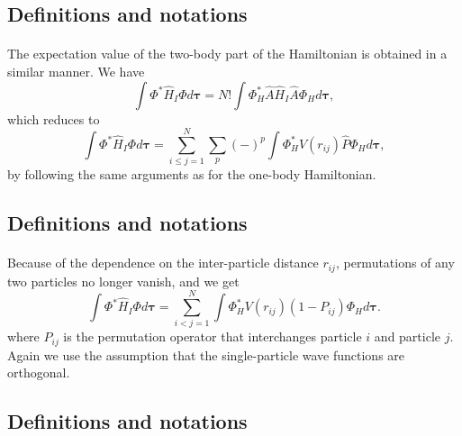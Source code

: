 \documentclass[%
twoside,                 %
final,                   %
10pt]{article}
\begin{document}
\subsection{Definitions and notations}

\paragraph{}
The expectation value of the two-body part of the Hamiltonian is obtained in a
similar manner. We have
\[
  \int \Phi^*\hat{H}_I\Phi d\mathbf{\tau} 
  = N! \int \Phi_H^*\hat{A}\hat{H}_I\hat{A}\Phi_H d\mathbf{\tau},
\]
which reduces to
\[
 \int \Phi^*\hat{H}_I\Phi d\mathbf{\tau} 
  = \sum_{i\le j=1}^N \sum_{p} (-)^p\int 
  \Phi_H^*V(r_{ij})\hat{P}\Phi_H d\mathbf{\tau},
\]
by following the same arguments as for the one-body
Hamiltonian.



\subsection{Definitions and notations}

\paragraph{}
Because of the dependence on the inter-particle distance $r_{ij}$,  permutations of
any two particles no longer vanish, and we get
\[
  \int \Phi^*\hat{H}_I\Phi d\mathbf{\tau} 
  = \sum_{i < j=1}^N \int  
  \Phi_H^*V(r_{ij})(1-P_{ij})\Phi_H d\mathbf{\tau}.
\]
where $P_{ij}$ is the permutation operator that interchanges
particle $i$ and particle $j$. Again we use the assumption that the single-particle wave functions
are orthogonal.




\subsection{Definitions and notations}

\end{document}
